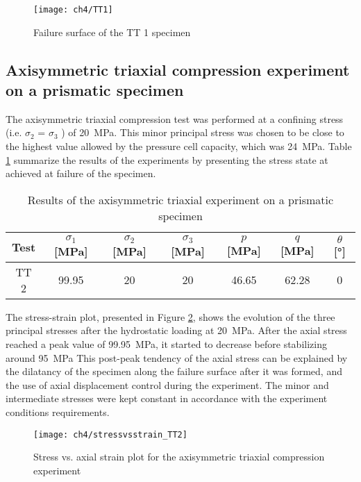 \begin{figure}[tb]
    \centering
    \texttt{[image: ch4/TT1]}
    \captionsetup{justification=centering}
    \caption{Failure surface of the TT 1 specimen}
    \label{fig4:12}
\end{figure} 

\subsection{Axisymmetric triaxial compression experiment on a prismatic specimen}

The axisymmetric triaxial compression test was performed at a confining stress (i.e. $\sigma_2$ = $\sigma_3$ ) of \SI{20}{MPa}. This minor principal stress was chosen to be close to the highest value allowed by the pressure cell capacity, which was \SI{24}{MPa}. Table \ref{tb4:TT2} summarize the results of the experiments by presenting the stress state at achieved at failure of the specimen. 

\begin{table}
    \centering
    \captionsetup{justification=centering}
    \caption{Results of the axisymmetric triaxial experiment on a prismatic specimen}
    \begin{tabular}{ccccccc}
        \hline
        Test & $\sigma_1$ [\si{MPa}] & $\sigma_2$ [\si{MPa}] & $\sigma_3$ [\si{MPa}] & $p$ [\si{MPa}] & $q$ [\si{MPa}] & $\theta$ [\si{\degree}] \\
        \hline
        \hline
        TT 2 & 99.95 & 20 & 20 & 46.65 & 62.28 & 0\\
        \hline
    \end{tabular}
    \label{tb4:TT2}
\end{table}

The stress-strain plot, presented in Figure \ref{fig4:13}, shows the evolution of the three principal stresses after the hydrostatic loading at \SI{20}{MPa}. After the axial stress reached a peak value of \SI{99.95}{MPa}, it started to decrease before stabilizing around \SI{95}{MPa} This post-peak tendency of the axial stress can be explained by the dilatancy of the specimen along the failure surface after it was formed, and the use of axial displacement control during the experiment. The minor and intermediate stresses were kept constant in accordance with the experiment conditions requirements.

\begin{figure}[tb]
    \centering
    \texttt{[image: ch4/stressvsstrain\_TT2]}
    \captionsetup{justification=centering}
    \caption{Stress vs. axial strain plot for the axisymmetric triaxial compression experiment}
    \label{fig4:13}
\end{figure} 

